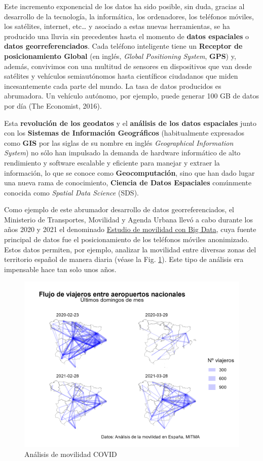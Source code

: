\documentclass[
]{book}
\theoremstyle{definition}
\theoremstyle{definition}
\theoremstyle{definition}
\theoremstyle{definition}
\theoremstyle{remark}
\begin{document}
Este incremento exponencial de los datos ha sido posible, sin duda, gracias al
desarrollo de la tecnología, la informática, los ordenadores, los teléfonos
móviles, los satélites, internet, etc\ldots{} y asociado a estas nuevas herramientas,
se ha producido una lluvia sin precedentes hasta el momento de \textbf{datos
espaciales} o \textbf{datos georreferenciados}. Cada teléfono inteligente tiene un
\textbf{Receptor de posicionamiento Global} (en inglés, \emph{Global Positioning System},
\textbf{GPS}) y, además, convivimos con una multitud de sensores en dispositivos que
van desde satélites y vehículos semiautónomos hasta científicos ciudadanos que
miden incesantemente cada parte del mundo. La tasa de datos producidos es
abrumadora. Un vehículo autónomo, por ejemplo, puede generar 100 GB de datos por
día (The Economist, 2016).

Esta \textbf{revolución de los geodatos} y el \textbf{análisis de los datos espaciales}
junto con los \textbf{Sistemas de Información Geográficos} (habitualmente expresados
como \textbf{GIS} por las siglas de su nombre en inglés \emph{Geographical Information
System}) no sólo han impulsado la demanda de hardware informático de alto
rendimiento y software escalable y eficiente para manejar y extraer la
información, lo que se conoce como \textbf{Geocomputación}, sino que han dado lugar
una nueva rama de conocimiento, \textbf{Ciencia de Datos Espaciales} comúnmente
conocida como \emph{Spatial Data Science} (SDS).

Como ejemplo de este abrumador desarrollo de datos georreferenciados, el
Ministerio de Transportes, Movilidad y Agenda Urbana llevó a cabo durante los
años 2020 y 2021 el denominado \href{https://www.mitma.gob.es/ministerio/covid-19/evolucion-movilidad-big-data}{Estudio de movilidad con Big
Data},
cuya fuente principal de datos fue el posicionamiento de los teléfonos móviles
anonimizado. Estos datos permiten, por ejemplo, analizar la movilidad entre
diversas zonas del territorio español de manera diaria (véase la Fig.
\ref{fig:mov}). Este tipo de análisis era impensable hace tan solo unos años.

\begin{figure}

{\centering \includegraphics[width=0.6\linewidth]{img/movilidad_covid} 

}

\caption{Análisis de movilidad COVID}\label{fig:mov}
\end{figure}
\end{document}
